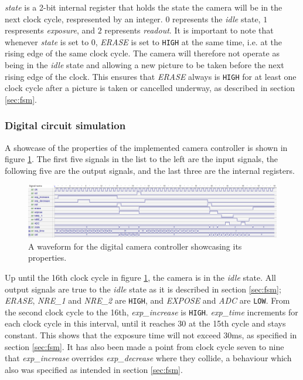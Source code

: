 \emph{state} is a 2-bit internal register that holds the state the camera will be in the next clock cycle, respresented by an integer. $0$ represents the \emph{idle} state, $1$ respresents \emph{exposure}, and $2$ represents \emph{readout}. It is important to note that whenever \emph{state} is set to $0$, \emph{ERASE} is set to \verb|HIGH| at the same time, i.e. at the rising edge of the same clock cycle. The camera will therefore not operate as being in the \emph{idle} state and allowing a new picture to be taken before the next rising edge of the clock. This ensures that \emph{ERASE} always is \verb|HIGH| for at least one clock cycle after a picture is taken or cancelled underway, as described in section \ref{sec:fsm}.

\subsubsection{Digital circuit simulation}

A showcase of the properties of the implemented camera controller is shown in figure \ref{fig:waveform}. The first five signals in the list to the left are the input signals, the following five are the output signals, and the last three are the internal registers.

\begin{figure}[H]
    \centering
    \includegraphics[width=\textwidth]{graphs/digital_waveform.png}
    \caption{A waveform for the digital camera controller showcasing its properties.}
    \label{fig:waveform}
\end{figure}

Up until the 16th clock cycle in figure \ref{fig:waveform}, the camera is in the \emph{idle} state. All output signals are true to the \emph{idle} state as it is described in section \ref{sec:fsm}; \emph{ERASE}, \emph{NRE\_1} and \emph{NRE\_2} are \verb|HIGH|, and \emph{EXPOSE} and \emph{ADC} are \verb|LOW|. From the second clock cycle to the 16th, \emph{exp\_increase} is \verb|HIGH|. \emph{exp\_time} increments for each clock cycle in this interval, until it reaches $30$ at the 15th cycle and stays constant. This shows that the exposure time will not exceed $30$ms, as specified in section \ref{sec:fsm}. It has also been made a point from clock cycle seven to nine that \emph{exp\_increase} overrides \emph{exp\_decrease} where they collide, a behaviour which also was specified as intended in section \ref{sec:fsm}.

